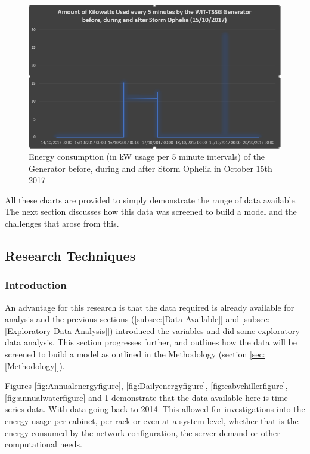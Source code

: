\documentclass[12pt]{scrartcl}
\begin{document}
\begin{figure}[H]
  \caption{Energy consumption (in kW usage per 5 minute intervals) of the Generator before, during and after Storm Ophelia in October 15th 2017}
  \label{fig:opheliafigure}
  \centering
    \includegraphics[scale=0.50]{Ophelia_generator}
\end{figure} 

All these charts are provided to simply demonstrate the range of data available. The next section discusses how this data was screened to build a model and the challenges that arose from this.  

\subsection{Research Techniques}
\label{subsec:[Research Techniques]}

\subsubsection{Introduction}
\label{subsubsec:[Introduction]}

An advantage for this research is that the data required is already available for analysis and the previous sections (\ref{subsec:[Data Available]} and \ref{subsec:[Exploratory Data Analysis]}) introduced the variables and did some exploratory data analysis. This section progresses further, and outlines how the data will be screened to build a model as outlined in the Methodology (section \ref{sec:[Methodology]}). 

Figures \ref{fig:Annualenergyfigure}, \ref{fig:Dailyenergyfigure}, \ref{fig:cabvchillerfigure}, \ref{fig:annualwaterfigure} and \ref{fig:opheliafigure} demonstrate that the data available here is time series data. With data going back to 2014. This allowed for investigations into the energy usage per cabinet, per rack or even at a system level, whether that is the energy consumed by the network configuration, the server demand or other computational needs. 
\end{document}
